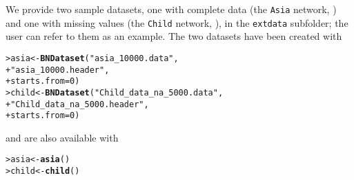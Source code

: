 \documentclass{article}\usepackage[]{graphicx}\usepackage[]{color}
\makeatletter
\newcommand{\hlnum}[1]{\textcolor[rgb]{0.686,0.059,0.569}{#1}}%
\newcommand{\hlstr}[1]{\textcolor[rgb]{0.192,0.494,0.8}{#1}}%
\newcommand{\hlstd}[1]{\textcolor[rgb]{0.345,0.345,0.345}{#1}}%
\newcommand{\hlkwb}[1]{\textcolor[rgb]{0.69,0.353,0.396}{#1}}%
\newcommand{\hlkwc}[1]{\textcolor[rgb]{0.333,0.667,0.333}{#1}}%
\newcommand{\hlkwd}[1]{\textcolor[rgb]{0.737,0.353,0.396}{\textbf{#1}}}%
\newenvironment{kframe}{%
 \def\at@end@of@kframe{}%
 \ifinner\ifhmode%
  \def\at@end@of@kframe{\end{minipage}}%
  \begin{minipage}{\columnwidth}%
 \fi\fi%
 \def\FrameCommand##1{\hskip\@totalleftmargin \hskip-\fboxsep
 \colorbox{shadecolor}{##1}\hskip-\fboxsep
     \hskip-\linewidth \hskip-\@totalleftmargin \hskip\columnwidth}%
 \MakeFramed {\advance\hsize-\width
   \@totalleftmargin\z@ \linewidth\hsize
   \@setminipage}}%
 {\par\unskip\endMakeFramed%
 \at@end@of@kframe}
\newenvironment{knitrout}{}{} %
\makeatother
\begin{document}
We provide two sample datasets, one with complete data (the \texttt{Asia} network, \citet*{lauritzen1988local}) and one with missing values
(the \texttt{Child} network, \citet*{spiegelhalter1993bayesian}), in the \texttt{extdata} subfolder;
the user can refer to them as an example. The two datasets have been created with

\begin{knitrout}
\color{fgcolor}\begin{kframe}
\begin{alltt}
\hlstd{> }\hlstd{asia} \hlkwb{<-} \hlkwd{BNDataset}\hlstd{(}\hlstr{"asia_10000.data"}\hlstd{,}
\hlstd{+ }                  \hlstr{"asia_10000.header"}\hlstd{,}
\hlstd{+ }                  \hlkwc{starts.from}\hlstd{=}\hlnum{0}\hlstd{)}
\hlstd{> }\hlstd{child} \hlkwb{<-} \hlkwd{BNDataset}\hlstd{(}\hlstr{"Child_data_na_5000.data"}\hlstd{,}
\hlstd{+ }                   \hlstr{"Child_data_na_5000.header"}\hlstd{,}
\hlstd{+ }                   \hlkwc{starts.from}\hlstd{=}\hlnum{0}\hlstd{)}
\end{alltt}
\end{kframe}
\end{knitrout}

and are also available with

\begin{knitrout}
\color{fgcolor}\begin{kframe}
\begin{alltt}
\hlstd{> }\hlstd{asia}  \hlkwb{<-} \hlkwd{asia}\hlstd{()}
\hlstd{> }\hlstd{child} \hlkwb{<-} \hlkwd{child}\hlstd{()}
\end{alltt}
\end{kframe}
\end{knitrout}
\end{document}
